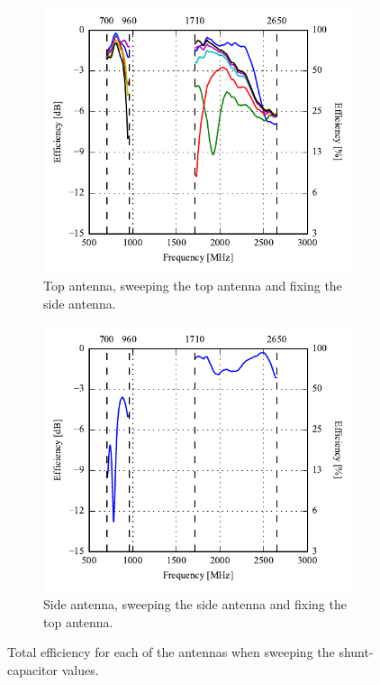 \begin{figure}[htbp]
    \centering
    \begin{subfigure}{0.49\linewidth}
        \includegraphics{img/tech_sol/nonresonant/prototype/efficiency_top.pdf}
        \caption{Top antenna, sweeping the top antenna and fixing the side antenna.}
    \end{subfigure}
    \hfill
    \begin{subfigure}{0.49\linewidth}
        \includegraphics{img/tech_sol/nonresonant/prototype/efficiency_side.pdf}
        \caption{Side antenna, sweeping the side antenna and fixing the top antenna.}
    \end{subfigure}
    \caption{Total efficiency for each of the antennas when sweeping the shunt-capacitor values.}
    \label{fig:nonresonant_proto_sweep_efficiency}
\end{figure}